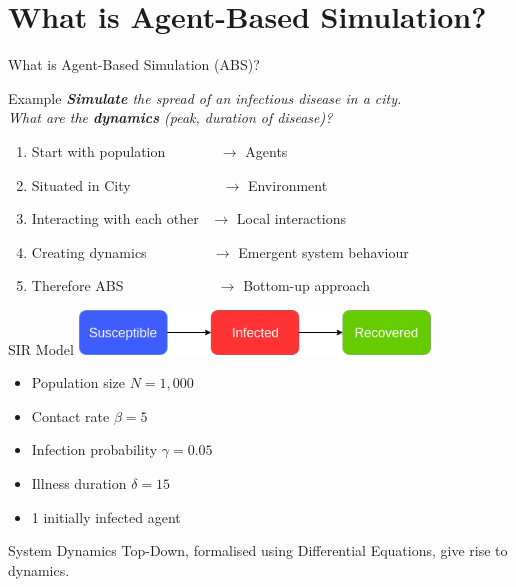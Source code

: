 \documentclass{beamer}
\begin{document}
\section{What is Agent-Based Simulation?}
\begin{frame}{What is Agent-Based Simulation (ABS)?} 
  \begin{block}{Example}
    \textit{\textbf{Simulate} the spread of an infectious disease in a city. \\ What are the \textbf{dynamics} (peak, duration of disease)?}
  \end{block}
  
  \begin{enumerate}
    \item Start with population \, \, \, \, \, \, \, $\to$ Agents
 	\item Situated in City \, \, \, \, \, \, \, \, \, \, \, \,\, $\to$ Environment
 	\item Interacting with each other \, $\to$ Local interactions
 	\item Creating dynamics \, \, \, \, \, \, \, \,\,\, $\to$ Emergent system behaviour
 	\item Therefore ABS \, \, \, \, \, \, \, \, \, \, \, \,\,\, $\to$ Bottom-up approach
  \end{enumerate}
\end{frame}

\begin{frame}{SIR Model}
  \includegraphics[width=0.7\textwidth]{./fig/SIR_transitions.png}
  
  \begin{itemize}
    \item Population size $N = 1,000$
 	\item Contact rate $\beta = 5$
 	\item Infection probability $\gamma = 0.05$
 	\item Illness duration $\delta = 15$
 	\item 1 initially infected agent
  \end{itemize}
    
  \begin{block}{System Dynamics}
    Top-Down, formalised using Differential Equations, give rise to dynamics.
  \end{block}
\end{frame}
\end{document}
